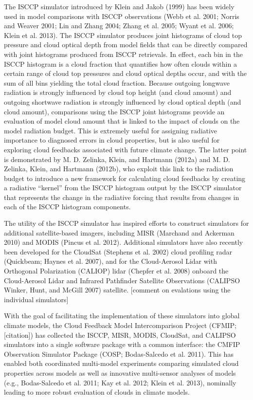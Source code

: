 The ISCCP simulator introduced by Klein and Jakob (1999) has been widely
used in model comparisons with ISCCP observations (Webb et al. 2001;
Norris and Weaver 2001; Lin and Zhang 2004; Zhang et al. 2005; Wyant et
al. 2006; Klein et al. 2013). The ISCCP simulator produces joint
histograms of cloud top pressure and cloud optical depth from model
fields that can be directly compared with joint histograms produced from
ISCCP retrievals. In effect, each bin in the ISCCP histogram is a cloud
fraction that quantifies how often clouds within a certain range of
cloud top pressures and cloud optical depths occur, and with the sum of
all bins yielding the total cloud fraction. Because outgoing longwave
radiation is strongly influenced by cloud top height (and cloud amount)
and outgoing shortwave radiation is strongly influenced by cloud optical
depth (and cloud amount), comparisons using the ISCCP joint histograms
provide an evaluation of model cloud amount that is linked to the impact
of clouds on the model radiation budget. This is extremely useful for
assigning radiative importance to diagnosed errors in cloud properties,
but is also useful for exploring cloud feedbacks associated with future
climate change. The latter point is demonstrated by M. D. Zelinka,
Klein, and Hartmann (2012a) and M. D. Zelinka, Klein, and Hartmann
(2012b), who exploit this link to the radiation budget to introduce a
new framework for calculating cloud feedbacks by creating a radiative
``kernel'' from the ISCCP histogram output by the ISCCP simulator that
represents the change in the radiative forcing that results from changes
in each of the ISCCP histogram components.

The utility of the ISCCP simulator has inspired efforts to construct
simulators for additional satellite-based imagers, including MISR
(Marchand and Ackerman 2010) and MODIS (Pincus et al. 2012). Additional
simulators have also recently been developed for the CloudSat (Stephens
et al. 2002) cloud profiling radar (Quickbeam; Haynes et al. 2007), and
for the Cloud-Aerosol Lidar with Orthogonal Polarization (CALIOP) lidar
(Chepfer et al. 2008) onboard the Cloud-Aerosol Lidar and Infrared
Pathfinder Satellite Observations (CALIPSO Winker, Hunt, and McGill
2007) satellite. {[}comment on evalations using the individual
simulators{]}

With the goal of facilitating the implementation of these simulators
into global climate models, the Cloud Feedback Model Intercomparison
Project (CFMIP; {[}citation{]}) has collected the ISCCP, MISR, MODIS,
CloudSat, and CALIPSO simulators into a single software package with a
common interface: the CMFIP Observation Simulator Package (COSP;
Bodas-Salcedo et al. 2011). This has enabled both coordinated
multi-model experiments comparing simulated cloud properties across
models as well as innovative multi-sensor analyses of models (e.g.,
Bodas-Salcedo et al. 2011; Kay et al. 2012; Klein et al. 2013),
nominally leading to more robust evaluation of clouds in climate models.

